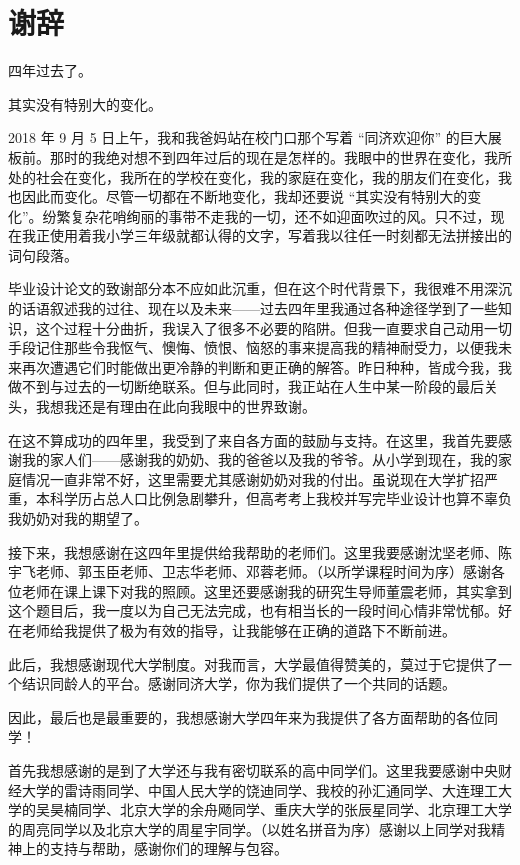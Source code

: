 \section*{谢辞}

四年过去了。

其实没有特别大的变化。

2018 年 9 月 5 日上午，我和我爸妈站在校门口那个写着 “同济欢迎你” 的巨大展板前。那时的我绝对想不到四年过后的现在是怎样的。我眼中的世界在变化，我所处的社会在变化，我所在的学校在变化，我的家庭在变化，我的朋友们在变化，我也因此而变化。尽管一切都在不断地变化，我却还要说 “其实没有特别大的变化”。纷繁复杂花哨绚丽的事带不走我的一切，还不如迎面吹过的风。只不过，现在我正使用着我小学三年级就都认得的文字，写着我以往任一时刻都无法拼接出的词句段落。

毕业设计论文的致谢部分本不应如此沉重，但在这个时代背景下，我很难不用深沉的话语叙述我的过往、现在以及未来——过去四年里我通过各种途径学到了一些知识，这个过程十分曲折，我误入了很多不必要的陷阱。但我一直要求自己动用一切手段记住那些令我怄气、懊悔、愤恨、恼怒的事来提高我的精神耐受力，以便我未来再次遭遇它们时能做出更冷静的判断和更正确的解答。昨日种种，皆成今我，我做不到与过去的一切断绝联系。但与此同时，我正站在人生中某一阶段的最后关头，我想我还是有理由在此向我眼中的世界致谢。

在这不算成功的四年里，我受到了来自各方面的鼓励与支持。在这里，我首先要感谢我的家人们——感谢我的奶奶、我的爸爸以及我的爷爷。从小学到现在，我的家庭情况一直非常不好，这里需要尤其感谢奶奶对我的付出。虽说现在大学扩招严重，本科学历占总人口比例急剧攀升，但高考考上我校并写完毕业设计也算不辜负我奶奶对我的期望了。

接下来，我想感谢在这四年里提供给我帮助的老师们。这里我要感谢沈坚老师、陈宇飞老师、郭玉臣老师、卫志华老师、邓蓉老师。（以所学课程时间为序）感谢各位老师在课上课下对我的照顾。这里还要感谢我的研究生导师董震老师，其实拿到这个题目后，我一度以为自己无法完成，也有相当长的一段时间心情非常忧郁。好在老师给我提供了极为有效的指导，让我能够在正确的道路下不断前进。

此后，我想感谢现代大学制度。对我而言，大学最值得赞美的，莫过于它提供了一个结识同龄人的平台。感谢同济大学，你为我们提供了一个共同的话题。

因此，最后也是最重要的，我想感谢大学四年来为我提供了各方面帮助的各位同学！

首先我想感谢的是到了大学还与我有密切联系的高中同学们。这里我要感谢中央财经大学的雷诗雨同学、中国人民大学的饶迪同学、我校的孙汇通同学、大连理工大学的吴昊楠同学、北京大学的余舟{飏}同学、重庆大学的张辰星同学、北京理工大学的周亮同学以及北京大学的周星宇同学。（以姓名拼音为序）感谢以上同学对我精神上的支持与帮助，感谢你们的理解与包容。

